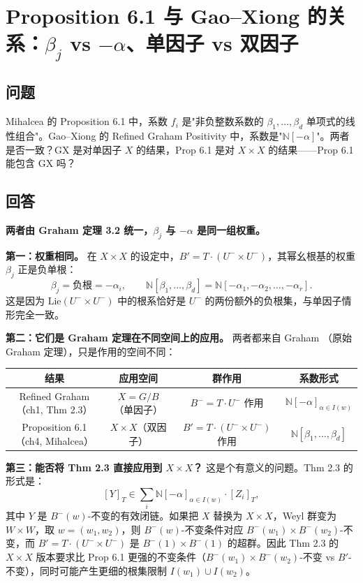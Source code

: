 \section{Proposition 6.1 与 Gao--Xiong \cite{GX2025} 的关系：$\beta_j$ vs $-\alpha$、单因子 vs 双因子}
\subsection{问题}
Mihalcea 的 Proposition 6.1 中，系数 $f_i$ 是"非负整数系数的 $\beta_1,\ldots,\beta_d$ 单项式的线性组合"。Gao--Xiong \cite{GX2025} 的 Refined Graham Positivity 中，系数是"$\mathbb{N}[-\alpha]$"。两者是否一致？GX 是对单因子 $X$ 的结果，Prop 6.1 是对 $X \times X$ 的结果——Prop 6.1 能包含 GX 吗？
\subsection{回答}
\textbf{两者由 Graham 定理 3.2 统一，$\beta_j$ 与 $-\alpha$ 是同一组权重。}

\textbf{第一：权重相同。} 在 $X \times X$ 的设定中，$B' = T \cdot (U^- \times U^-)$，其幂幺根基的权重 $\beta_j$ 正是负单根：
$$\beta_j = \text{负根} = -\alpha_i, \qquad \mathbb{N}[\beta_1,\ldots,\beta_d] = \mathbb{N}[-\alpha_1,-\alpha_2,\ldots,-\alpha_r].$$
这是因为 $\mathrm{Lie}(U^- \times U^-)$ 中的根系恰好是 $U^-$ 的两份额外的负根集，与单因子情形完全一致。

\textbf{第二：它们是 Graham 定理在不同空间上的应用。} 两者都来自 Graham \cite[ Theorem 3.2]{Gr}（原始 Graham 定理），只是作用的空间不同：

\begin{tabular}{c|c|c|c}
结果 & 应用空间 & 群作用 & 系数形式 \\ \hline
\cite{GX2025} Refined Graham（ch1, Thm 2.3） & $X = G/B$（单因子） & $B^- = T\cdot U^-$ 作用 & $\mathbb{N}[-\alpha]_{\alpha \in I(w)}$ \\
Proposition 6.1（ch4, Mihalcea） & $X \times X$（双因子） & $B' = T\cdot (U^-\times U^-)$ 作用 & $\mathbb{N}[\beta_1,\ldots,\beta_d]$ \\
\end{tabular}

\textbf{第三：能否将 Thm 2.3 直接应用到 $X \times X$？} 这是个有意义的问题。Thm 2.3 的形式是：
$$[Y]_T \in \sum_i \mathbb{N}[-\alpha]_{\alpha \in I(w)} \cdot [Z_i]_T,$$
其中 $Y$ 是 $B^-(w)$-不变的有效闭链。如果把 $X$ 替换为 $X \times X$，Weyl 群变为 $W \times W$，取 $w = (w_1, w_2)$，则 $B^-(w)$-不变条件对应 $B^-(w_1)\times B^-(w_2)$-不变，而 $B' = T\cdot(U^-\times U^-)$ 是 $B^-(1)\times B^-(1)$ 的超群。因此 Thm 2.3 的 $X \times X$ 版本要求比 Prop 6.1 更强的不变条件（$B^-(w_1)\times B^-(w_2)$-不变 vs $B'$-不变），同时可能产生更细的根集限制 $I(w_1)\cup I(w_2)$。


